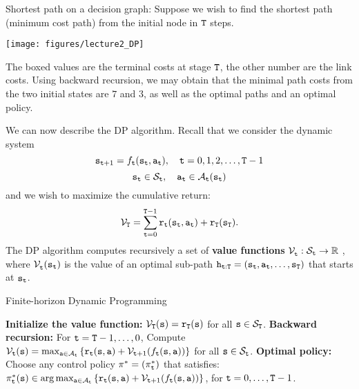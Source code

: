 \begin{example}
Shortest path on a decision graph:  Suppose we wish to find the
shortest path (minimum cost path) from the initial node in
${\tt T}$ steps.

\begin{centering}
\texttt{[image: figures/lecture2\_DP]}
\end{centering}

\medskip
The boxed values are the terminal costs at stage ${\tt T}$, the
other number are the link costs. Using backward recursion, we may
obtain that the minimal path costs from the two initial states are
$7$ and $3$, as well as the optimal paths and an optimal policy.
\end{example}

We can now describe the DP algorithm. Recall that we consider the dynamic system
$${{\tt s}_{{\tt t} + 1}} = {f_{{\tt t}}}({{\tt s}_{{\tt t}}},{{\tt a}_{{\tt t}}}),\quad {\tt t} = 0,1,2, \ldots ,{\tt T} - 1$$
$${{\tt s}_{{\tt t}}} \in {\mathcal{S}_{{\tt t}}},\quad {{\tt a}_{{\tt t}}} \in {\mathcal{A}_{{\tt t}}}({{\tt s}_{{\tt t}}})$$
and we wish to maximize the cumulative return:
$${\mathcal{V}_{\tt T}} = \sum_{{\tt t} = 0}^{{\tt T} - 1} {{{\tt r}_{{\tt t}}}({{\tt s}_{{\tt t}}},{{\tt a}_{{\tt t}}}) + {{\tt r}_{\tt T}}({{\tt s}_{\tt T}})} .$$
The DP algorithm computes recursively a set of \textbf{value
functions} $\mathcal{V}_{{\tt t}}^{}:{\mathcal{S}_{{\tt t}}} \to \mathbb{R}$ , where
$\mathcal{V}_{{\tt t}}^{}({{\tt s}_{{\tt t}}})$ is the value of an optimal
sub-path ${{\tt h}_{{\tt t}:{\tt T}}} =
({{\tt s}_{{\tt t}}},{{\tt a}_{{\tt t}}}, \ldots ,{{\tt s}_{\tt T}})$
that starts at ${{\tt s}_{{\tt t}}}$.


\begin{algorithm}
\caption{Finite-horizon Dynamic Programming}
\label{Alg:FHDP-DDP}
\begin{algorithmic}[1]
\State \textbf{Initialize the value function:}
\State \quad $\mathcal{V}_{\tt T}({\tt s}) = {\tt r}_{\tt T}({\tt s})$ for all ${\tt s} \in \mathcal{S}_{\tt T}$.
\State \textbf{Backward recursion:} For ${\tt t} = {\tt T} - 1, \ldots ,0$,
\State \quad Compute $\mathcal{V}_{{\tt t}}({\tt s}) = \max_{{\tt a} \in \mathcal{A}_{{\tt t}}} \left\{ {\tt r}_{{\tt t}}({\tt s},{\tt a}) + \mathcal{V}_{{\tt t} + 1}(f_{{\tt t}}({\tt s},{\tt a})) \right\}$ for all ${\tt s} \in \mathcal{S}_{{\tt t}}$.
\State \textbf{Optimal policy:} Choose any control policy $\pi^*  = (\pi^*_{{\tt t}})$ that satisfies:
\State \quad $\pi^*_{{\tt t}}({\tt s}) \in \arg \max_{{\tt a} \in \mathcal{A}_{{\tt t}}} \left\{ {\tt r}_{{\tt t}}({\tt s},{\tt a}) + \mathcal{V}_{{\tt t} + 1}(f_{{\tt t}}({\tt s},{\tt a})) \right\}$, for ${\tt t} = 0, \ldots ,{\tt T} - 1$.
\end{algorithmic}
\end{algorithm}

